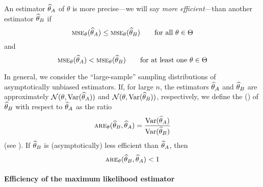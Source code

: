 An estimator $\widehat{\theta}_A$ of $\theta$ is more precise---we will say
\emph{more efficient}---than another estimator $\widehat{\theta}_B$ if
\[
    \stsc{MSE}_{\theta}(\sthat{\theta}_A) \leq 
    \stsc{MSE}_{\theta}(\sthat{\theta}_B)
    \qquad\text{for all $\theta \in \Theta$}
\]
\alert{and                                                                     
\[
    \stsc{MSE}_{\theta}(\sthat{\theta}_A) < 
    \stsc{MSE}_{\theta}(\sthat{\theta}_B)
    \qquad\text{for at least one $\theta \in \Theta$}
\]
}

In general, we consider the “large-sample” sampling distributions of
asymptotically unbiased estimators. If, for large $n$, the estimators
$\widehat{\theta}_A$ and $\widehat{\theta}_B$ are approximately
$\mathcal{N}(\theta, \textrm{Var}(\widehat{\theta}_A))$ and
$\mathcal{N}(\theta, \textrm{Var}(\widehat{\theta}_B))$, respectively, we
define the \emph{} () of
$\widehat{\theta}_B$ with respect to $\widehat{\theta}_A$ as the ratio
\[
    \stsc{ARE}_{\theta}(\sthat{\theta}_B,\sthat{\theta}_A) 
    = \frac{ \textrm{Var}(\sthat{\theta}_A)}{\textrm{Var}(\sthat{\theta}_B)}
\]
(see \citealp{Serfling1980}). If $\widehat{\theta}_B$ is (asymptotically) less
efficient than $\widehat{\theta}_A$, then
\[
    \stsc{ARE}_{\theta}(\sthat{\theta}_B,\sthat{\theta}_A) < 1
\]


\paragraph{Efficiency of the maximum likelihood estimator}

